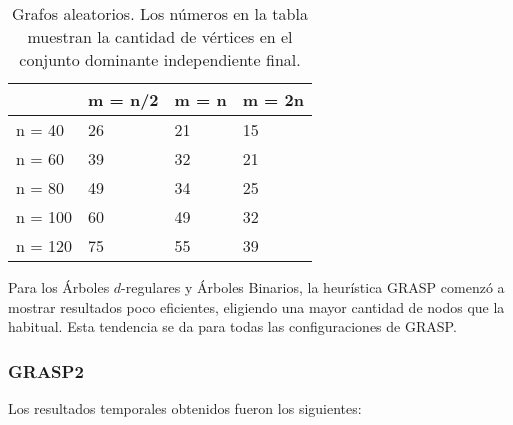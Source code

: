 \begin{table}[H]
\centering
\label{my-label}
\begin{tabular}{|l|lll|}
\hline
        & \multicolumn{1}{l|}{m = n/2} & \multicolumn{1}{l|}{m = n} & m = 2n \\ \hline
n = 40  & 26                           & 21                         & 15     \\ \cline{1-1}
n = 60  & 39                           & 32                         & 21     \\ \cline{1-1}
n = 80  & 49                           & 34                         & 25     \\ \cline{1-1}
n = 100 & 60                           & 49                         & 32     \\ \cline{1-1}
n = 120 & 75                           & 55                         & 39     \\ \hline
\end{tabular}
\caption{Grafos aleatorios. Los números en la tabla muestran la cantidad de vértices en el conjunto dominante independiente final.}
\end{table}

Para los Árboles $d$-regulares y Árboles Binarios, la heurística GRASP comenzó a mostrar resultados poco eficientes, eligiendo una mayor cantidad de nodos que la habitual. Esta tendencia se da para todas las configuraciones de GRASP.

\subsubsection{GRASP2}

Los resultados temporales obtenidos fueron los siguientes:

